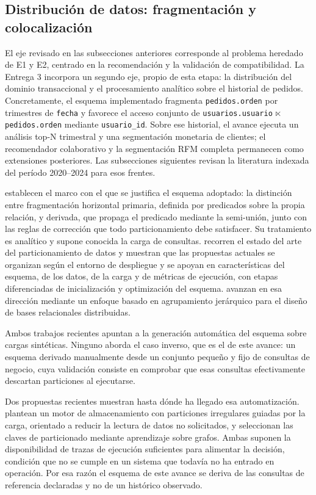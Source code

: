 \documentclass[12pt]{article}
\begin{document}
    \subsection{Distribución de datos: fragmentación y colocalización}

    El eje revisado en las subsecciones anteriores corresponde al problema heredado de E1 y E2, centrado en la recomendación y la validación de compatibilidad. La Entrega 3 incorpora un segundo eje, propio de esta etapa: la distribución del dominio transaccional y el procesamiento analítico sobre el historial de pedidos. Concretamente, el esquema implementado fragmenta \texttt{pedidos.orden} por trimestres de \texttt{fecha} y favorece el acceso conjunto de \texttt{usuarios.usuario} $\ltimes$ \texttt{pedidos.orden} mediante \texttt{usuario\_id}. Sobre ese historial, el avance ejecuta un análisis top-N trimestral y una segmentación monetaria de clientes; el recomendador colaborativo y la segmentación RFM completa permanecen como extensiones posteriores. Las subsecciones siguientes revisan la literatura indexada del período 2020--2024 para esos frentes.

    \textcite{ozsu2020} establecen el marco con el que se justifica el esquema adoptado: la distinción entre fragmentación horizontal primaria, definida por predicados sobre la propia relación, y derivada, que propaga el predicado mediante la semi-unión, junto con las reglas de corrección que todo particionamiento debe satisfacer. Su tratamiento es analítico y supone conocida la carga de consultas. \textcite{liu2024} recorren el estado del arte del particionamiento de datos y muestran que las propuestas actuales se organizan según el entorno de despliegue y se apoyan en características del esquema, de los datos, de la carga y de métricas de ejecución, con etapas diferenciadas de inicialización y optimización del esquema. \textcite{abdalla2023} avanzan en esa dirección mediante un enfoque basado en agrupamiento jerárquico para el diseño de bases relacionales distribuidas.

    Ambos trabajos recientes apuntan a la generación automática del esquema sobre cargas sintéticas. Ninguno aborda el caso inverso, que es el de este avance: un esquema derivado manualmente desde un conjunto pequeño y fijo de consultas de negocio, cuya validación consiste en comprobar que esas consultas efectivamente descartan particiones al ejecutarse.

    Dos propuestas recientes muestran hasta dónde ha llegado esa automatización. \textcite{kang2021jigsaw} plantean un motor de almacenamiento con particiones irregulares guiadas por la carga, orientado a reducir la lectura de datos no solicitados, y \textcite{zhou2023grep} seleccionan las claves de particionado mediante aprendizaje sobre grafos. Ambas suponen la disponibilidad de trazas de ejecución suficientes para alimentar la decisión, condición que no se cumple en un sistema que todavía no ha entrado en operación. Por esa razón el esquema de este avance se deriva de las consultas de referencia declaradas y no de un histórico observado.
\end{document}
